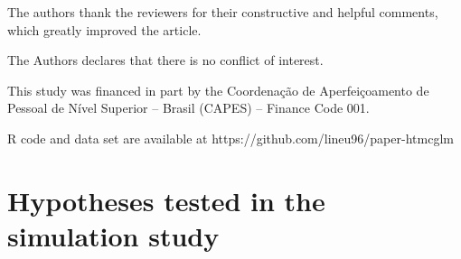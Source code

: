 \documentclass[Review,sagev,times, doublespace]{sagej}
\begin{document}

\begin{acks}
The authors thank the reviewers for their constructive and helpful comments, which greatly improved the article.
\end{acks}



\begin{dci}
The Authors declares that there is no conflict of interest.
\end{dci}

\begin{funding}
This study was
financed in part by the Coordenação de Aperfeiçoamento de Pessoal de Nível Superior – Brasil (CAPES) – Finance Code 001.
\end{funding}

\begin{sm}
R code and data set are available at https://github.com/lineu96/paper-htmcglm
\end{sm}





\appendix

\section{Hypotheses tested in the simulation study\label{app1}}

\end{document}

